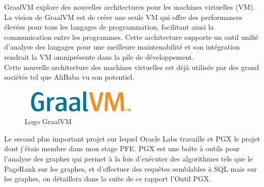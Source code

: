 GraalVM explore des nouvelles architectures pour les machines virtuelles (VM). La vision de GraalVM est de créer une seule VM qui offre des performances élevées pour tous les langages de programmation, facilitant ainsi la communication entre les programmes. Cette architecture supporte un outil unifié d'analyse des langages pour une meilleure maintenabilité et son intégration rendrait la VM omniprésente dans la pile de développement.\\

Cette nouvelle architecture des machines virtuelles est déjà utilisée par des grand sociétés tel que AliBaba vu son potentiel.\\

\begin{figure}[H]  
  \centering
    \includegraphics[width=0.5\textwidth]{chapitre1/Figures/GraalVM.png}
  \caption{Logo GraalVM}
\end{figure}

Le second plus important projet sur lequel Oracle Labs travaille et PGX le projet dont j’étais membre dans mon stage PFE. PGX est une boîte à outils pour l'analyse des graphes qui permet à la fois d'exécuter des algorithmes tels que le PageRank sur les graphes, et d'effectuer des requêtes semblables à SQL mais sur les graphes, on détaillera dans la suite de ce rapport l’Outil PGX.